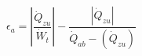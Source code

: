 

\item[(d)] 
    \[
    \epsilon_a = \left| \frac{\dot{Q}_{zu}}{\dot{W}_t} \right| - \frac{\left| \dot{Q}_{zu} \right|}{\dot{Q}_{ab} - \left( \dot{Q}_{zu} \right)}
    \]